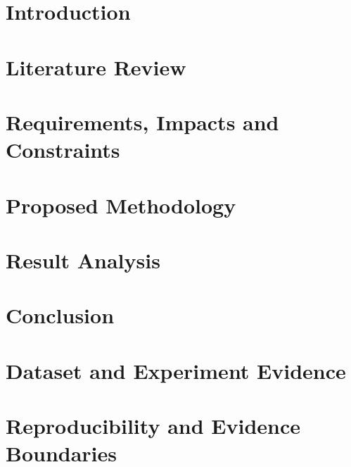 \documentclass[Times,12pt,oneside,openany,print,index]{report}
\let\cleardoublepage=\clearpage
\begin{document}
\thispagestyle{empty}

\cleardoublepage
{}






\renewcommand{\contentsname}{Table of Contents}
\cleardoublepage
{}
\tableofcontents
\listoffigures
\listoftables

\cleardoublepage{}
{}
\printnomenclature
\cleardoublepage
{}
\chapter{Introduction}
\chapter{Literature Review}
\chapter{Requirements, Impacts and Constraints}
\chapter{Proposed Methodology}
\chapter{Result Analysis}
\chapter{Conclusion}
\printbibliography[heading=bibintoc,title={Bibliography}]
\appendix
\chapter{Dataset and Experiment Evidence}\label{app:evidence}


\chapter{Reproducibility and Evidence Boundaries}\label{app:repro}

\end{document}
